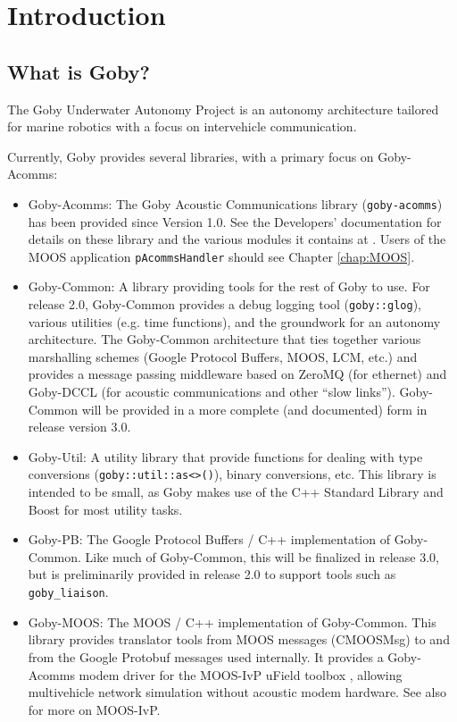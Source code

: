\chapter{Introduction}

\section{What is Goby?}

The Goby Underwater Autonomy Project is an \gls{autonomy architecture} tailored for marine robotics with a focus on intervehicle communication.

Currently, Goby provides several libraries, with a primary focus on Goby-Acomms:

\begin{itemize}
\item Goby-Acomms: The Goby Acoustic Communications library (\verb|goby-acomms|) has been provided since Version 1.0. See the Developers' documentation for details on these library and the various modules it contains at \cite{goby-doc}. Users of the MOOS application \verb|pAcommsHandler| should see Chapter \ref{chap:MOOS}.
\item Goby-Common: A library providing tools for the rest of Goby to use. For release 2.0, Goby-Common provides a debug logging tool (\verb|goby::glog|), various utilities (e.g. time functions), and the groundwork for an \gls{autonomy architecture}. The Goby-Common architecture that ties together various marshalling schemes (Google Protocol Buffers, MOOS, LCM, etc.) and provides a message passing middleware based on ZeroMQ (for ethernet) and Goby-DCCL (for acoustic communications and other ``slow links''). Goby-Common will be provided in a more complete (and documented) form in release version 3.0.
\item Goby-Util: A utility library that provide functions for dealing with type conversions (\verb|goby::util::as<>()|), binary conversions, etc. This library is intended to be small, as Goby makes use of the C++ Standard Library and Boost for most utility tasks.
\item Goby-PB: The Google Protocol Buffers / C++ implementation of Goby-Common. Like much of Goby-Common, this will be finalized in release 3.0, but is preliminarily provided in release 2.0 to support tools such as \verb|goby_liaison|.
\item Goby-MOOS: The MOOS \cite{moos} / C++ implementation of Goby-Common. This library provides translator tools from MOOS messages (CMOOSMsg) to and from the Google Protobuf messages used internally. It provides a Goby-Acomms modem driver for the MOOS-IvP uField toolbox \cite{ufield}, allowing multivehicle network simulation without acoustic modem hardware. See also \cite{moos-ivp-jfr} for more on MOOS-IvP.
\end{itemize}


